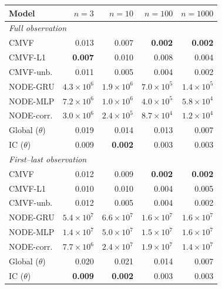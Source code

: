 \begin{tabular}{lrrrr}
\toprule
Model & $n{=}3$ & $n{=}10$ & $n{=}100$ & $n{=}1000$ \\
\midrule
\multicolumn{5}{l}{\emph{Full observation}} \\
CMVF & 0.013 & 0.007 & \textbf{0.002} & \textbf{0.002} \\
CMVF-L1 & \textbf{0.007} & 0.010 & 0.008 & 0.004 \\
CMVF-unb. & 0.011 & 0.005 & 0.004 & 0.002 \\
NODE-GRU & $4.3\!\times\!10^{6}$ & $1.9\!\times\!10^{6}$ & $7.0\!\times\!10^{5}$ & $1.4\!\times\!10^{5}$ \\
NODE-MLP & $7.2\!\times\!10^{6}$ & $1.0\!\times\!10^{6}$ & $4.0\!\times\!10^{5}$ & $5.8\!\times\!10^{4}$ \\
NODE-corr. & $3.0\!\times\!10^{6}$ & $2.4\!\times\!10^{5}$ & $8.7\!\times\!10^{4}$ & $1.2\!\times\!10^{4}$ \\
Global ($\theta$) & 0.019 & 0.014 & 0.013 & 0.007 \\
IC ($\theta$) & 0.009 & \textbf{0.002} & 0.003 & 0.003 \\
\midrule
\multicolumn{5}{l}{\emph{First--last observation}} \\
CMVF & 0.012 & 0.009 & \textbf{0.002} & \textbf{0.002} \\
CMVF-L1 & 0.010 & 0.010 & 0.004 & 0.005 \\
CMVF-unb. & 0.012 & 0.005 & 0.004 & 0.002 \\
NODE-GRU & $5.4\!\times\!10^{7}$ & $6.6\!\times\!10^{7}$ & $1.6\!\times\!10^{7}$ & $1.6\!\times\!10^{7}$ \\
NODE-MLP & $1.4\!\times\!10^{7}$ & $5.0\!\times\!10^{7}$ & $1.5\!\times\!10^{7}$ & $1.6\!\times\!10^{7}$ \\
NODE-corr. & $7.7\!\times\!10^{6}$ & $2.4\!\times\!10^{7}$ & $1.9\!\times\!10^{7}$ & $1.4\!\times\!10^{7}$ \\
Global ($\theta$) & 0.020 & 0.021 & 0.014 & 0.007 \\
IC ($\theta$) & \textbf{0.009} & \textbf{0.002} & 0.003 & 0.003 \\
\bottomrule
\end{tabular}
